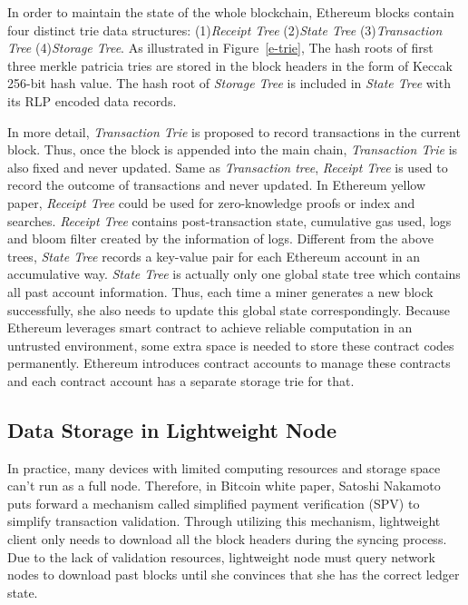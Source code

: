 \documentclass[conference]{IEEEtran}
\begin{document}
In order to maintain the state of the whole blockchain, Ethereum blocks contain four distinct trie data structures: (1)\textit{Receipt Tree} (2)\textit{State Tree} (3)\textit{Transaction Tree} (4)\textit{Storage Tree}.
%
As illustrated in Figure~\ref{e-trie}, The hash roots of first three merkle patricia tries are stored in the block headers in the form of Keccak 256-bit hash value. 
%
The hash root of \textit{Storage Tree} is included in \textit{State Tree} with its RLP encoded data records.

In more detail, \textit{Transaction Trie} is proposed to record transactions in the current block.
%
Thus, once the block is appended into the main chain, \textit{Transaction Trie} is also fixed and never updated.
%
Same as \textit{Transaction tree}, \textit{Receipt Tree} is used to record the outcome of transactions and never updated.
%
In Ethereum yellow paper\cite{Ethereumstorage}, \textit{Receipt Tree} could be used for zero-knowledge proofs or index and searches.
%
\textit{Receipt Tree} contains post-transaction state, cumulative gas used, logs and bloom filter created by the information of logs.
%
Different from the above trees, \textit{State Tree} records a key-value pair for each Ethereum account in an accumulative way.
%
\textit{State Tree} is actually only one global state tree which contains all past account information.
%
Thus, each time a miner generates a new block successfully, she also needs to update this global state correspondingly.
%
Because Ethereum leverages smart contract to achieve reliable computation in an untrusted environment, some extra space is needed to store these contract codes permanently.
%
Ethereum introduces contract accounts to manage these contracts and each contract account has a separate storage trie for that.

\subsection{Data Storage in Lightweight Node}
In practice, many devices with limited computing resources and storage space can't run as a full node.
%
Therefore, in Bitcoin white paper\cite{nakamoto2008bitcoin}, Satoshi Nakamoto puts forward a mechanism called simplified payment verification (SPV) to simplify transaction validation.
%
Through utilizing this mechanism, lightweight client only needs to download all the block headers during the syncing process.
%
Due to the lack of validation resources, lightweight node must query network nodes to download past blocks until she convinces that she has the correct ledger state.
\end{document}
